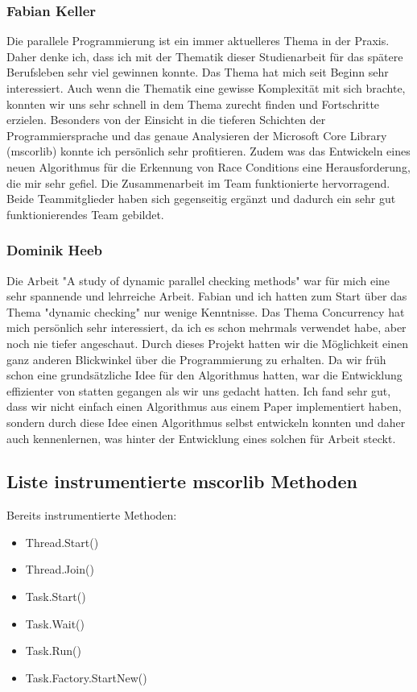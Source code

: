 \documentclass[10pt,a4paper]{article}
\begin{document}
\subsubsection*{Fabian Keller}
Die parallele Programmierung ist ein immer aktuelleres Thema in der Praxis. Daher denke ich, dass ich mit der Thematik dieser Studienarbeit für das spätere Berufsleben sehr viel gewinnen konnte. Das Thema  hat mich seit Beginn sehr interessiert. Auch wenn die Thematik eine gewisse Komplexität mit sich brachte, konnten wir uns sehr schnell in dem Thema zurecht finden und Fortschritte erzielen. Besonders von der Einsicht in die tieferen Schichten der Programmiersprache und das genaue Analysieren der Microsoft Core Library (mscorlib) konnte ich persönlich sehr profitieren. Zudem was das Entwickeln eines neuen Algorithmus für die Erkennung von Race Conditions eine Herausforderung, die mir sehr gefiel. Die Zusammenarbeit im Team funktionierte hervorragend. Beide Teammitglieder haben sich gegenseitig ergänzt und dadurch ein sehr gut funktionierendes Team gebildet.\\
\subsubsection*{Dominik Heeb}
Die Arbeit "A study of dynamic parallel checking methods" war für mich eine sehr spannende und lehrreiche Arbeit. Fabian und ich hatten zum Start über das Thema "dynamic checking" nur wenige Kenntnisse. Das Thema Concurrency hat mich persönlich sehr interessiert, da ich es schon mehrmals verwendet habe, aber noch nie tiefer angeschaut. Durch dieses Projekt hatten wir die Möglichkeit einen ganz anderen Blickwinkel über die Programmierung zu erhalten. Da wir früh schon eine grundsätzliche Idee für den Algorithmus hatten, war die Entwicklung effizienter von statten gegangen als wir uns gedacht hatten. Ich fand sehr gut, dass wir nicht einfach einen Algorithmus aus einem Paper implementiert haben, sondern durch diese Idee einen Algorithmus selbst entwickeln konnten und daher auch kennenlernen, was hinter der Entwicklung eines solchen für Arbeit steckt.
\subsection*{Liste instrumentierte mscorlib Methoden}\label{sec:instrumentierte_methoden}
Bereits instrumentierte Methoden:
\begin{itemize}
\setlength\itemsep{0em}
\item Thread.Start()
\item Thread.Join()
\item Task.Start()
\item Task.Wait()
\item Task.Run()
\item Task.Factory.StartNew()
\end{itemize}
\end{document}
